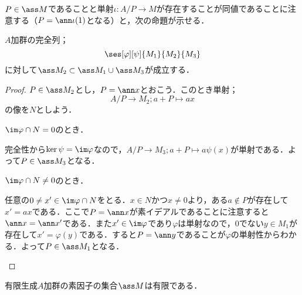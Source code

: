 $P\in\ass M$であることと単射$\iota:A/P\to M$が存在することが同値であることに注意する（$P=\ann \iota(1)$となる）と，次の命題が示せる．
\begin{prop}\label{prop:完全列とass}
	$A$加群の完全列；
	\[\ses[\varphi][\psi]{M_1}{M_2}{M_3}\]
	に対して$\ass M_2\subset \ass M_1\cup\ass M_3$が成立する．
\end{prop}
\begin{proof}
	$P\in\ass M_2$とし，$P=\ann x$とおこう．このとき単射；
	\[A/P\to M_2;a+P\mapsto ax\]
	の像を$N$としよう．
	
	\begin{sakura}
		\item $\im\varphi\cap N=0$のとき．
		
		完全性から$\ker\psi=\im\varphi$なので，$A/P\to M_3;a+P\mapsto a\psi(x)$が単射である．よって$P\in\ass M_3$となる．
		
		\item $\im\varphi\cap N\neq0$のとき．
		
		任意の$0\neq x'\in\im\varphi\cap N$をとる．$x\in N$かつ$x\neq0$より，ある$a\not\in P$が存在して$x'=ax$である．ここで$P=\ann x$が素イデアルであることに注意すると$\ann x=\ann x'$である．また$x'\in\im\varphi$であり$\varphi$は単射なので，$0$でない$y\in M_1$が存在して$x'=\varphi(y)$である．すると$P=\ann y$であることが$\varphi$の単射性からわかる．よって$P\in\ass M_1$となる．
	\end{sakura}
\end{proof}
\begin{thm}
	有限生成$A$加群の素因子の集合$\ass M$は有限である．
\end{thm}
